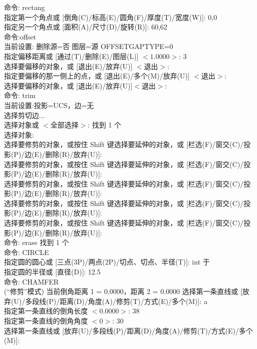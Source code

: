 \noindent
命令: rectang\\
指定第一个角点或 [倒角(C)/标高(E)/圆角(F)/厚度(T)/宽度(W)]: 0,0\\
指定另一个角点或 [面积(A)/尺寸(D)/旋转(R)]: 60,62\\
命令:offset\\
当前设置: 删除源=否  图层=源  OFFSETGAPTYPE=0\\
指定偏移距离或 [通过(T)/删除(E)/图层(L)] $<1.0000>$:  3\\
选择要偏移的对象，或 [退出(E)/放弃(U)] $<$退出$>$:\\
指定要偏移的那一侧上的点，或 [退出(E)/多个(M)/放弃(U)] $<$退出$>$:\\
选择要偏移的对象，或 [退出(E)/放弃(U)]$<$退出$>$:\\
命令: trim\\
当前设置:投影=UCS，边=无\\
选择剪切边...\\
选择对象或 $<$全部选择$>$:  找到 1 个\\
选择对象:\\
选择要修剪的对象，或按住 Shift 键选择要延伸的对象，或
[栏选(F)/窗交(C)/投影(P)/边(E)/删除(R)/放弃(U)]:\\
选择要修剪的对象，或按住 Shift 键选择要延伸的对象，或
[栏选(F)/窗交(C)/投影(P)/边(E)/删除(R)/放弃(U)]:\\
选择要修剪的对象，或按住 Shift 键选择要延伸的对象，或
[栏选(F)/窗交(C)/投影(P)/边(E)/删除(R)/放弃(U)]:\\
选择要修剪的对象，或按住 Shift 键选择要延伸的对象，或
[栏选(F)/窗交(C)/投影(P)/边(E)/删除(R)/放弃(U)]:\\
选择要修剪的对象，或按住 Shift 键选择要延伸的对象，或
[栏选(F)/窗交(C)/投影(P)/边(E)/删除(R)/放弃(U)]:\\
命令: erase 找到 1 个\\
命令: CIRCLE\\
指定圆的圆心或 [三点(3P)/两点(2P)/切点、切点、半径(T)]: int 于\\
指定圆的半径或 [直径(D)]: 12.5\\
命令:  CHAMFER\\
(“修剪”模式) 当前倒角距离 1 = 0.0000，距离 2 = 0.0000
选择第一条直线或 [放弃(U)/多段线(P)/距离(D)/角度(A)/修剪(T)/方式(E)/多个(M)]:  a \\
指定第一条直线的倒角长度 $<$0.0000$>$: 38 \\
指定第一条直线的倒角角度 $<$0$>$: 30\\
选择第一条直线或 [放弃(U)/多段线(P)/距离(D)/角度(A)/修剪(T)/方式(E)/多个(M)]:\\
